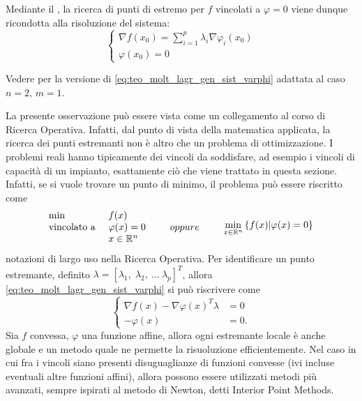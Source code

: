\begin{samepage}
	\begin{observation}
		\label{obs:sist_eqiv_lagr}
		Mediante il , la ricerca di punti di estremo per $f$ vincolati a $\varphi = 0$ viene dunque ricondotta alla risoluzione del sistema:
		\begin{equation}
			\label{eq:teo_molt_lagr_gen_sist_varphi}
			\begin{cases}
				\nabla f(x_0) = \sum\limits_{i = 1}^{p} \lambda_i \nabla \varphi_i (x_0)\\
				\varphi(x_0) = 0
			\end{cases}
		\end{equation}
		\vspace*{-.5\baselineskip}
		\begin{note}
			Vedere  per la versione di \cref{eq:teo_molt_lagr_gen_sist_varphi} adattata al caso $n=2,\,m=1$.
		\end{note}
	\end{observation}
\end{samepage}

\cbstart
\begin{observation}
	La presente osservazione può essere vista come un collegamento al corso di Ricerca Operativa.
	Infatti, dal punto di vista della matematica applicata, la ricerca dei punti estremanti non è altro che un problema di ottimizzazione.
	I problemi reali hanno tipicamente dei vincoli da soddisfare, ad esempio i vincoli di capacità di un impianto, esattamente ciò che viene trattato in questa sezione.
	Infatti, se si vuole trovare un punto di minimo, il problema può essere riscritto come
	\[
		\begin{array}{ll}
			\min &f(x)\\
			\text{vincolato a } &\varphi(x) = 0\\
			& x \in \mathbb{R}^n
		\end{array}
		\qquad oppure \qquad
		\begin{array}{c}
			\displaystyle\min_{x \in \mathbb{R}^n} \left\{f(x) | \varphi(x) = 0\right\}
		\end{array}
	\]
	notazioni di largo uso nella Ricerca Operativa.
	Per identificare un punto estremante, definito $\lambda = [ \lambda_1,\; \lambda_2,\:\dotsc\:\lambda_p ]^T$, allora \ref{eq:teo_molt_lagr_gen_sist_varphi} si può riscrivere come
	\[
		\begin{cases}
			\nabla f(x) - \nabla \varphi (x)^T \lambda &= 0\\
			-\varphi (x) &= 0.
		\end{cases}
	\]
	Sia $f$ convessa, $\varphi$ una funzione affine, allora ogni estremante locale è anche globale e un metodo quale  ne permette la risuoluzione efficientemente.
	Nel caso in cui fra i vincoli siano presenti disuguaglianze di funzioni convesse (ivi incluse eventuali altre funzioni affini), allora possono essere utilizzati metodi più avanzati, sempre ispirati al metodo di Newton, detti Interior Point Methods.
\end{observation}
\cbend

